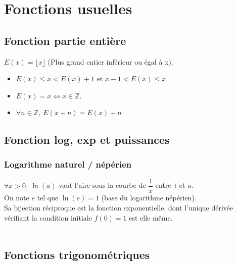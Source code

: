 \documentclass[13pt, twoside, a4paper, french]{report}
\begin{document}
\chapter{Fonctions usuelles}\label{ch:fonctions-usuelles}
  
  
  \section{Fonction partie entière}\label{sec:fonction-partie-entiere}
    
    $E(x) = \lfloor x \rfloor$ (Plus grand entier inférieur ou égal à x).\\
    
    \begin{itemize}
      \item $E(x) \le x < E(x) + 1$ et $x-1 < E(x) \le x$.
      \item $E(x) = x \Leftrightarrow x \in \mathbb{Z}$.
      \item $\forall n \in \mathbb{Z},\ E(x + n) = E(x) + n$
    \end{itemize}
  
  
  \section{Fonction log, exp et puissances}\label{sec:fonction-log-exp-puissances}
    
    \subsection{Logarithme naturel / népérien}\label{subsec:logarithme-naturel-/-neperien}
      
      $\forall x > 0,\ \ln(a)$ vaut l'aire sous la courbe de $\dfrac{1}{x}$ entre $1$ et $a$.\\
      On note $e$ tel que $\ln(e) = 1$ (base du logarithme népérien).\\
      Sa bijection réciproque est la fonction exponentielle, dont l'unique dérivée vérifiant la condition initiale $f(0) = 1$ est elle même.\\
      
      \\
  
  
  \section{Fonctions trigonométriques}\label{sec:fonctions-trigonometriques}
\end{document}
